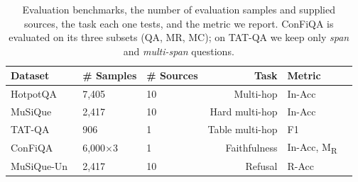\begin{table}[t!]
\centering
\footnotesize
\begin{tabular}{lllrll}
\toprule
\textbf{Dataset} & \textbf{\# Samples} & \textbf{\# Sources} & \textbf{Task} & \textbf{Metric} \\
\midrule
HotpotQA~\citep{hotpotqa} & 7{,}405 & 10 & Multi-hop & In-Acc \\
MuSiQue~\citep{musique} & 2{,}417 & 10 & Hard multi-hop & In-Acc \\
TAT-QA~\citep{tat-qa} & 906 & 1 & Table multi-hop & F1 \\
ConFiQA~\citep{bi-etal-2025-context} & 6{,}000$\times$3 & 1 & Faithfulness & In-Acc, M\textsubscript{R} \\
MuSiQue-Un~\citep{musique} & 2{,}417 & 10 & Refusal & R-Acc \\
\bottomrule
\end{tabular}
\caption{Evaluation benchmarks, the number of evaluation samples and supplied sources, the task each one tests, and the metric we report. ConFiQA is evaluated on its three subsets (QA, MR, MC); on TAT-QA we keep only \textit{span} and \textit{multi-span} questions.}
\label{tab:benchmarks}
\end{table}